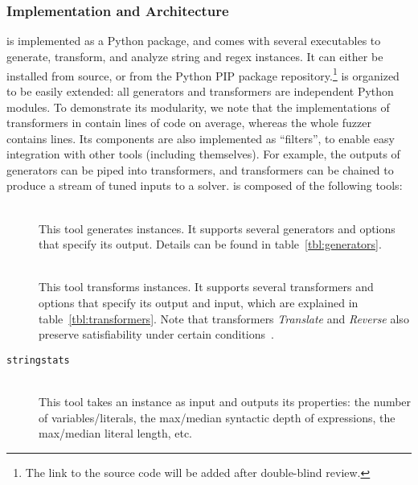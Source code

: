\section{\fuzzer{}}
\label{sec:fuzzer}

\subsubsection{Implementation and Architecture}

\fuzzer{} is implemented as a Python package, and comes with several
executables to generate, transform, and analyze \smtfull{} string and regex
instances. It can either be installed from source, or from the Python
PIP package repository.\footnote{The link to the
source code will be added after double-blind review.}
\fuzzer{} is organized to be easily extended:
all generators and transformers are independent Python modules. To demonstrate
its modularity, we note that the implementations of transformers in \fuzzer{}
contain \linesPerX{} lines of code on average, whereas the whole fuzzer
contains \linesInFuzzer{} lines. Its components are also
implemented as \unix{} ``filters'', to enable easy
integration with other tools (including themselves). For example, the
outputs of generators can be piped into transformers, and transformers
can be chained to produce a stream of tuned inputs to a
solver. \fuzzer{} is composed of the following tools:
\begin{description}
    \item[\generator{}] \hfill \\
        This tool generates \smt{} instances. It supports several generators and
        options that specify its output. Details can be found in
        table~\ref{tbl:generators}.
    \item[\transformer{}] \hfill \\
        This tool transforms \smt{}
        instances. It supports several transformers and options that specify
        its output and input, which are explained in
        table~\ref{tbl:transformers}. Note that transformers
        \textit{Translate} and \textit{Reverse} also preserve
        satisfiability under certain conditions~\cite{ifaz}.
    \item[\texttt{stringstats}] \hfill \\
        This tool takes an \smt{}
        instance as input and outputs its properties: the number of
        variables/literals, the max/median syntactic depth of expressions, the
        max/median literal length, etc.
\end{description}

